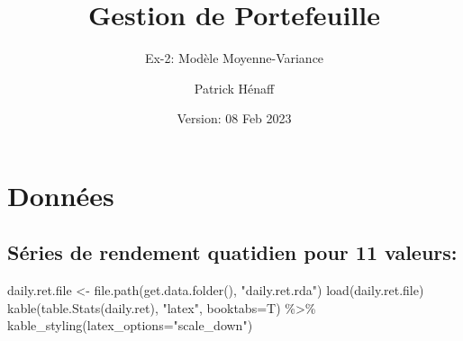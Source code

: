 \documentclass[
]{article}
\title{Gestion de Portefeuille}
\subtitle{Ex-2: Modèle Moyenne-Variance}
\author{Patrick Hénaff}
\date{Version: 08 Feb 2023}
\newenvironment{Shaded}{\begin{snugshade}}{\end{snugshade}}
\newcommand{\AttributeTok}[1]{\textcolor[rgb]{0.77,0.63,0.00}{#1}}
\newcommand{\FunctionTok}[1]{\textcolor[rgb]{0.00,0.00,0.00}{#1}}
\newcommand{\NormalTok}[1]{#1}
\newcommand{\OtherTok}[1]{\textcolor[rgb]{0.56,0.35,0.01}{#1}}
\newcommand{\SpecialCharTok}[1]{\textcolor[rgb]{0.00,0.00,0.00}{#1}}
\newcommand{\StringTok}[1]{\textcolor[rgb]{0.31,0.60,0.02}{#1}}
\begin{document}
\maketitle

\hypertarget{donnuxe9es}{%
\section{Données}\label{donnuxe9es}}

\hypertarget{suxe9ries-de-rendement-quatidien-pour-11-valeurs}{%
\subsection{Séries de rendement quatidien pour 11
valeurs:}\label{suxe9ries-de-rendement-quatidien-pour-11-valeurs}}

\begin{Shaded}
\begin{Highlighting}[]
\NormalTok{daily.ret.file }\OtherTok{\textless{}{-}} \FunctionTok{file.path}\NormalTok{(}\FunctionTok{get.data.folder}\NormalTok{(), }\StringTok{"daily.ret.rda"}\NormalTok{)}
\FunctionTok{load}\NormalTok{(daily.ret.file)}
\FunctionTok{kable}\NormalTok{(}\FunctionTok{table.Stats}\NormalTok{(daily.ret), }\StringTok{"latex"}\NormalTok{, }\AttributeTok{booktabs=}\NormalTok{T) }\SpecialCharTok{\%\textgreater{}\%} \FunctionTok{kable\_styling}\NormalTok{(}\AttributeTok{latex\_options=}\StringTok{"scale\_down"}\NormalTok{)}
\end{Highlighting}
\end{Shaded}
\end{document}
